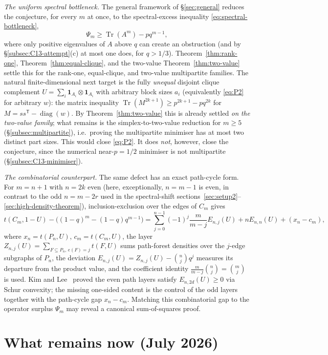 \documentclass[11pt]{article}
\newcommand{\Tr}{\operatorname{Tr}}
\begin{document}
\medskip\noindent\emph{The uniform spectral bottleneck.}
The general framework of \S\ref{sec:general} reduces the conjecture, for every $m$ at once, to the spectral-excess inequality \eqref{eq:spectral-bottleneck},
\[
        \Psi_m\ge\Tr(A^m)-pq^{m-1},
\]
where only positive eigenvalues of $A$ above $q$ can create an obstruction (and by \S\ref{subsec:C13-attempt}\textup{(c)} at most one does, for $q>1/3$).  Theorem~\ref{thm:rank-one}, Theorem~\ref{thm:equal-clique}, and the two-value Theorem~\ref{thm:two-value} settle this for the rank-one, equal-clique, and two-value multipartite families.  The natural finite-dimensional next target is the fully \emph{unequal} disjoint clique complement $U=\sum_i\mathbf 1_{A_i}\otimes\mathbf 1_{A_i}$ with arbitrary block sizes $a_i$ (equivalently \eqref{eq:P2} for arbitrary $w$): the matrix inequality $\Tr(M^{2k+1})\ge p^{2k+1}-pq^{2k}$ for $M=ss^{\mathsf T}-\operatorname{diag}(w)$.  By Theorem~\ref{thm:two-value} this is already settled \emph{on the two-value family}; what remains is the simplex-to-two-value reduction for $m\ge5$ (\S\ref{subsec:multipartite}), i.e.\ proving the multipartite minimiser has at most two distinct part sizes.  This would close \eqref{eq:P2}.  It does \emph{not}, however, close the conjecture, since the numerical near-$p=1/2$ minimiser is not multipartite (\S\ref{subsec:C13-minimiser}).

\medskip\noindent\emph{The combinatorial counterpart.}
The same defect has an exact path-cycle form.  For $m=n+1$ with $n=2k$ even (here, exceptionally, $n=m-1$ is even, in contrast to the odd $n=m-2r$ used in the spectral-shift sections~\ref{sec:setup2}--\ref{sec:high-density-theorem}), inclusion-exclusion over the edges of $C_m$ gives
\[
        t(C_m,1-U)-\bigl((1-q)^m-(1-q)q^{m-1}\bigr)
        =\sum_{j=0}^{n-1}(-1)^j\frac{m}{m-j}E_{n,j}(U)+nE_{n,n}(U)+(x_n-c_m),
\]
where $x_n=t(P_n,U)$, $c_m=t(C_m,U)$, the layer $Z_{n,j}(U)=\sum_{F\subseteq P_n,\,e(F)=j}t(F,U)$ sums path-forest densities over the $j$-edge subgraphs of $P_n$, the deviation $E_{n,j}(U)=Z_{n,j}(U)-\binom nj q^j$ measures its departure from the product value, and the coefficient identity $\frac{m}{m-j}\binom nj=\binom mj$ is used.  Kim and Lee~\cite{KimLee} proved the even path layers satisfy $E_{n,2d}(U)\ge0$ via Schur convexity; the missing one-sided content is the control of the odd layers together with the path-cycle gap $x_n-c_m$.  Matching this combinatorial gap to the operator surplus $\Psi_m$ may reveal a canonical sum-of-squares proof.

\section{What remains now (July 2026)}\label{sec:remains-new}
\end{document}
